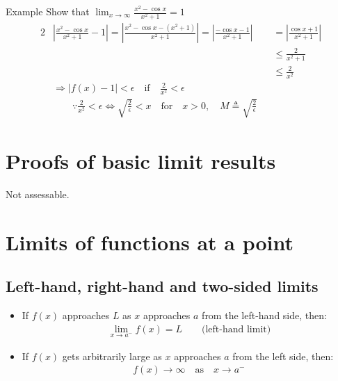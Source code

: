 \documentclass{report}
\begin{document}
		\begin{question}{Example}
			Show that $\displaystyle\lim_{x\to\infty} \frac{x^2 - \cos{x}}{x^2 + 1} = 1$
			\begin{alignat*}{2}
				& \left| \frac{x^2 - \cos{x}}{x^2 + 1} - 1 \right| = \left| \frac{x^2 - \cos{x} - (x^2 + 1)}{x^2 + 1} \right| = \left| \frac{-\cos{x} - 1}{x^2 + 1} \right| &&= \left| \frac{\cos{x} + 1}{x^2 + 1} \right|	\\
				& && \leq \frac{2}{x^2 + 1}	\\
				& && \leq \frac{2}{x^2}	\\
				& \Rightarrow \left| f(x) - 1 \right| < \epsilon \quad \text{if} \quad \frac{2}{x^2} < \epsilon	\\
				& \qquad \because \frac{2}{x^2} < \epsilon \Leftrightarrow \sqrt{\frac{2}{\epsilon}} < x \quad \text{for} \quad x > 0, \quad M \triangleq \sqrt{\frac{2}{\epsilon}}
			\end{alignat*}
		\end{question}

\section{Proofs of basic limit results}
	
	Not assessable.

\section{Limits of functions at a point}
	
	\subsection{Left-hand, right-hand and two-sided limits}

		\begin{itemize}
			\item If $f(x)$ approaches $L$ as $x$ approaches $a$ from the \textcolor{pastel_blue}{left}-hand side, then:
				\begin{align*}
					\lim_{x\to a^-} f(x) = L \qquad \text{(left-hand limit)}
				\end{align*}
			\item If $f(x)$ gets arbitrarily large as $x$ approaches $a$ from the \textcolor{pastel_blue}{left} side, then:
				\begin{align*}
					f(x) \rightarrow \infty \quad \text{as} \quad x \rightarrow a^-
				\end{align*}
		\end{itemize}
\end{document}
